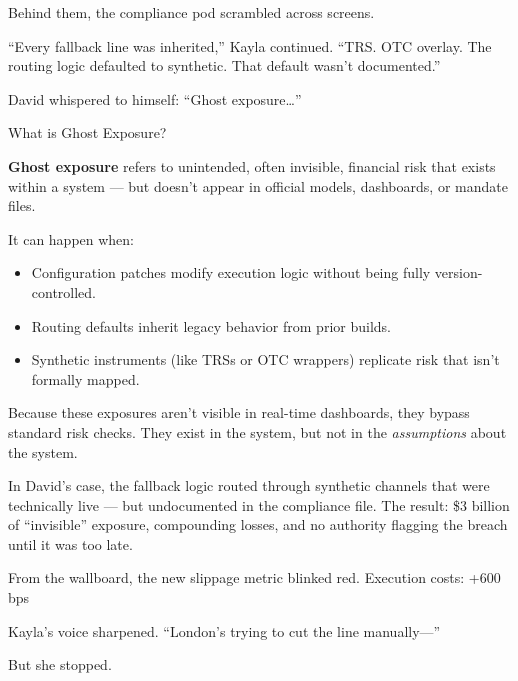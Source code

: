 \medskip

Behind them, the compliance pod scrambled across screens.

“Every fallback line was inherited,” Kayla continued. “TRS. OTC overlay. The routing logic defaulted to synthetic. 
That default wasn’t documented.”

David whispered to himself: “Ghost exposure…”

\medskip

\begin{TechnicalSidebar}{What is Ghost Exposure?}

  \textbf{Ghost exposure} refers to unintended, often invisible, financial risk that exists within a system — 
  but doesn’t appear in official models, dashboards, or mandate files.
  
  \medskip
  
  It can happen when:

  \medskip
  
  \begin{itemize}
    \item Configuration patches modify execution logic without being fully version-controlled.
    \item Routing defaults inherit legacy behavior from prior builds.
    \item Synthetic instruments (like TRSs or OTC wrappers) replicate risk that isn’t formally mapped.
  \end{itemize}
  
  \medskip
  
  Because these exposures aren’t visible in real-time dashboards, they bypass standard risk checks.  
  They exist in the system, but not in the \textit{assumptions} about the system.
  
  \medskip
  
  In David’s case, the fallback logic routed through synthetic channels that were technically live — but 
  undocumented in the compliance file.  
  The result: \$3 billion of “invisible” exposure, compounding losses, and no authority flagging the breach 
  until it was too late.
  
\end{TechnicalSidebar}

\medskip
  

From the wallboard, the new slippage metric blinked red.
Execution costs: +600 bps

Kayla’s voice sharpened. “London’s trying to cut the line manually—”

But she stopped.

